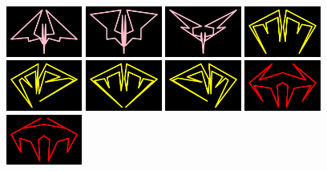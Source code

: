 \begin{figure}[H]
    \includegraphics[width=2.5cm]{preface/vector_images/vec_image_ener12.png}
    \includegraphics[width=2.5cm]{preface/vector_images/vec_image_ener13.png}
    \includegraphics[width=2.5cm]{preface/vector_images/vec_image_ener14.png}
    \includegraphics[width=2.5cm]{preface/vector_images/vec_image_ener21.png}
    \includegraphics[width=2.5cm]{preface/vector_images/vec_image_ener22.png}
    \includegraphics[width=2.5cm]{preface/vector_images/vec_image_ener23.png}
    \includegraphics[width=2.5cm]{preface/vector_images/vec_image_ener24.png}
    \includegraphics[width=2.5cm]{preface/vector_images/vec_image_ener41.png}
    \includegraphics[width=2.5cm]{preface/vector_images/vec_image_ener42.png}

\end{figure}
